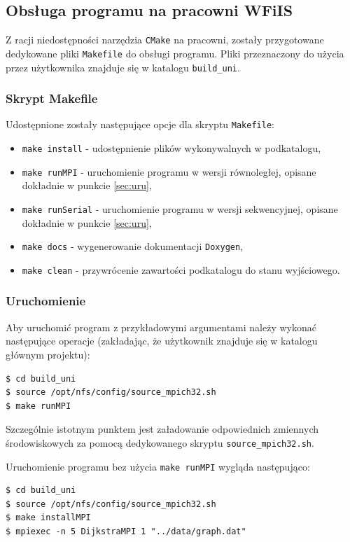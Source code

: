\documentclass[12pt]{article}
\begin{document}
\subsection{Obsługa programu na pracowni WFiIS}
Z racji niedostępności narzędzia \lstinline|CMake| na pracowni, zostały przygotowane dedykowane pliki \lstinline|Makefile| do obsługi programu. Pliki przeznaczony do użycia przez użytkownika znajduje się w katalogu \lstinline|build_uni|.

\subsubsection{Skrypt Makefile}

Udostępnione zostały następujące opcje dla skryptu \lstinline|Makefile|:
\begin{itemize}
\item \lstinline|make install| - udostępnienie plików wykonywalnych w podkatalogu,
\item \lstinline|make runMPI|  -  uruchomienie programu w wersji równoległej, opisane dokładnie w punkcie \ref{sec:uru},
\item \lstinline|make runSerial|  - uruchomienie programu w wersji sekwencyjnej, opisane dokładnie w punkcie  \ref{sec:uru},
\item \lstinline|make docs| - wygenerowanie dokumentacji \lstinline|Doxygen|, 
\item \lstinline|make clean| - przywrócenie zawartości podkatalogu do stanu wyjściowego.
\end{itemize}

\subsubsection{Uruchomienie}
Aby uruchomić program z przykładowymi argumentami należy wykonać następujące operacje (zakładając, że użytkownik znajduje się w katalogu głównym projektu):
\begin{lstlisting}
$ cd build_uni
$ source /opt/nfs/config/source_mpich32.sh
$ make runMPI
\end{lstlisting}

\noindent
Szczególnie istotnym punktem jest załadowanie odpowiednich zmiennych środowiskowych za pomocą dedykowanego skryptu \lstinline|source_mpich32.sh|.
\vspace{2cm}

Uruchomienie programu bez użycia \lstinline|make runMPI| wygląda następująco:
\begin{lstlisting}
$ cd build_uni
$ source /opt/nfs/config/source_mpich32.sh
$ make installMPI
$ mpiexec -n 5 DijkstraMPI 1 "../data/graph.dat"
\end{lstlisting}
\end{document}
